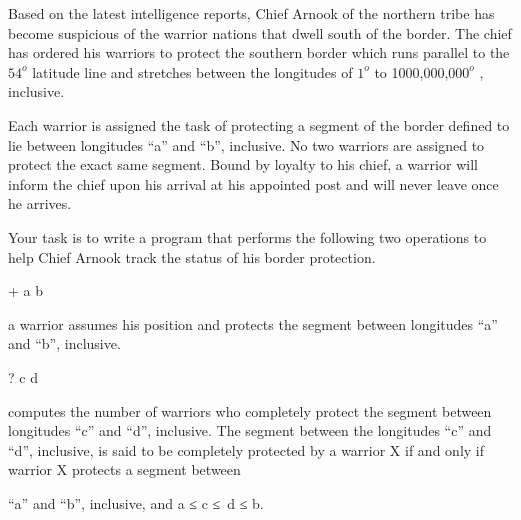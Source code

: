 Based on the latest intelligence reports, Chief Arnook of the northern tribe has become suspicious of the warrior nations that dwell south of the border. The chief has ordered his warriors to protect the southern border which runs parallel to the $54^{o}$     latitude line and stretches between the longitudes of $1^{o}$     to 1000,000,$000^{o}$     , inclusive.    

     Each warrior is assigned the task of protecting a segment of the border defined to lie between longitudes “a” and “b”, inclusive. No two warriors are assigned to protect the exact same segment. Bound by loyalty to his chief, a warrior will inform the chief upon his arrival at his appointed post and will never leave once he arrives.    

         Your task is to write a program that performs the following two operations                   to help Chief Arnook track the status of his border protection.         



        + a b       

        a warrior assumes his position and protects the segment between longitudes “a” and “b”, inclusive.       



        ? c d       

           computes the number of warriors who completely protect the segment between longitudes “c” and “d”, inclusive. The segment between the longitudes “c” and “d”, inclusive, is said to be completely protected by a warrior X if and only if warrior X protects a segment between          

            “a” and “b”, inclusive, and a ≤ c ≤ d ≤ b.            
\\


\\